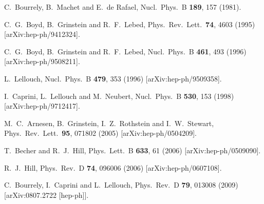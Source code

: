 \documentclass[12pt]{article}
\begin{document}
\begin{thebibliography}{99}
  C.~Bourrely, B.~Machet and E.~de Rafael,
  Nucl.\ Phys.\  B {\bf 189}, 157 (1981).

  C.~G.~Boyd, B.~Grinstein and R.~F.~Lebed,
  Phys.\ Rev.\ Lett.\  {\bf 74}, 4603 (1995)
  [arXiv:hep-ph/9412324].
  
  C.~G.~Boyd, B.~Grinstein and R.~F.~Lebed,
  Nucl.\ Phys.\  B {\bf 461}, 493 (1996)
  [arXiv:hep-ph/9508211].

  L.~Lellouch,
  Nucl.\ Phys.\  B {\bf 479}, 353 (1996)
  [arXiv:hep-ph/9509358].
  
  I.~Caprini, L.~Lellouch and M.~Neubert,
  Nucl.\ Phys.\  B {\bf 530}, 153 (1998)
  [arXiv:hep-ph/9712417].


  M.~C.~Arnesen, B.~Grinstein, I.~Z.~Rothstein and I.~W.~Stewart,
  Phys.\ Rev.\ Lett.\  {\bf 95}, 071802 (2005)
  [arXiv:hep-ph/0504209].

  T.~Becher and R.~J.~Hill,
  Phys.\ Lett.\  B {\bf 633}, 61 (2006)
  [arXiv:hep-ph/0509090].

  R.~J.~Hill,
  Phys.\ Rev.\  D {\bf 74}, 096006 (2006)
  [arXiv:hep-ph/0607108].
  
  C.~Bourrely, I.~Caprini and L.~Lellouch,
  Phys.\ Rev.\  D {\bf 79}, 013008 (2009)
  [arXiv:0807.2722 [hep-ph]].


\end{thebibliography}
\end{document}
